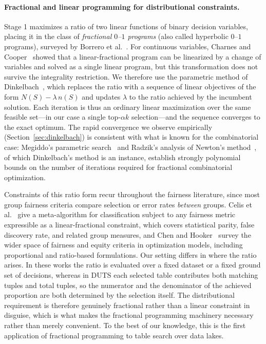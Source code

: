 
\paragraph{Fractional and linear programming for distributional constraints.}
Stage 1 maximizes a ratio of two linear functions of binary decision variables, placing it in
the class of \emph{fractional $0$--$1$ programs} (also called hyperbolic $0$--$1$ programs),
surveyed by Borrero et al.~\cite{borrero2017fractional}. For continuous variables, Charnes and
Cooper~\cite{charnes1962programming} showed that a linear-fractional program can be linearized
by a change of variables and solved as a single linear program, but this transformation does
not survive the integrality restriction. We therefore use the parametric method of
Dinkelbach~\cite{dinkelbach1967nonlinear}, which replaces the ratio with a sequence of linear
objectives of the form $N(S) - \lambda\,n(S)$ and updates $\lambda$ to the ratio achieved by
the incumbent solution. Each iteration is thus an ordinary linear maximization over the same
feasible set---in our case a single top-$\alpha k$ selection---and the sequence converges to
the exact optimum. The rapid convergence we observe empirically (Section~\ref{sec:dinkelbach})
is consistent with what is known for the combinatorial case: Megiddo's parametric
search~\cite{megiddo1979combinatorial} and Radzik's analysis of Newton's
method~\cite{radzik1992newton}, of which Dinkelbach's method is an instance, establish
strongly polynomial bounds on the number of iterations required for fractional combinatorial
optimization.

Constraints of this ratio form recur throughout the fairness literature, since most group
fairness criteria compare selection or error rates \emph{between} groups. Celis et
al.~\cite{DBLP:conf/fat/CelisHKV19} give a meta-algorithm for classification subject to any
fairness metric expressible as a linear-fractional constraint, which covers statistical parity,
false discovery rate, and related group measures, and Chen and
Hooker~\cite{chen2021guide} survey the wider space of fairness and equity criteria in
optimization models, including proportional and ratio-based formulations. Our setting differs
in where the ratio arises. In these works the ratio is evaluated over a fixed dataset or a
fixed ground set of decisions, whereas in DUTS each selected table contributes both matching
tuples and total tuples, so the numerator and the denominator of the achieved proportion are
both determined by the selection itself. The distributional requirement is therefore genuinely
fractional rather than a linear constraint in disguise, which is what makes the fractional
programming machinery necessary rather than merely convenient. To the best of our knowledge,
this is the first application of fractional programming to table search over data lakes.
